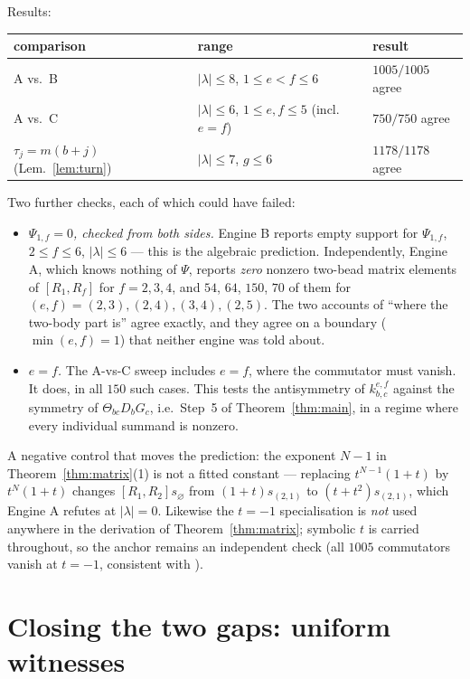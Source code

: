 \documentclass[11pt]{article}
\theoremstyle{definition}
\begin{document}
\noindent Results:
\begin{center}
\begin{tabular}{lll}
\hline
comparison & range & result\\
\hline
A vs.\ B & $|\lambda|\le8$, $1\le e<f\le6$ & $1005/1005$ agree\\
A vs.\ C & $|\lambda|\le6$, $1\le e,f\le5$ (incl.\ $e=f$) & $750/750$ agree\\
$\tau_j=m(b+j)$ (Lem.~\ref{lem:turn}) & $|\lambda|\le7$, $g\le6$ & $1178/1178$ agree\\
\hline
\end{tabular}
\end{center}

\noindent Two further checks, each of which could have failed:
\begin{itemize}
\item \emph{$\Psi_{1,f}=0$, checked from both sides.}  Engine B reports empty support for
$\Psi_{1,f}$, $2\le f\le6$, $|\lambda|\le6$ --- this is the algebraic prediction.
Independently, Engine A, which knows nothing of $\Psi$, reports \emph{zero} nonzero
two-bead matrix elements of $[R_1,R_f]$ for $f=2,3,4$, and $54$, $64$, $150$, $70$ of them
for $(e,f)=(2,3),(2,4),(3,4),(2,5)$.  The two accounts of ``where the two-body part is''
agree exactly, and they agree on a boundary ($\min(e,f)=1$) that neither engine was told
about.
\item \emph{$e=f$.}  The A-vs-C sweep includes $e=f$, where the commutator must vanish.
It does, in all $150$ such cases.  This tests the antisymmetry of $k^{e,f}_{b,c}$ against
the symmetry of $\Theta_{bc}D_bG_c$, i.e.\ Step~5 of Theorem~\ref{thm:main}, in a regime
where every individual summand is nonzero.
\end{itemize}

\noindent A negative control that moves the prediction: the exponent $N-1$ in
Theorem~\ref{thm:matrix}(1) is not a fitted constant --- replacing $t^{N-1}(1+t)$ by
$t^{N}(1+t)$ changes $[R_1,R_2]s_\varnothing$ from $(1+t)s_{(2,1)}$ to
$(t+t^{2})s_{(2,1)}$, which Engine A refutes at $|\lambda|=0$.  Likewise the $t=-1$
specialisation is \emph{not} used anywhere in the derivation of
Theorem~\ref{thm:matrix}; symbolic $t$ is carried throughout, so the anchor remains an
independent check (all $1005$ commutators vanish at $t=-1$, consistent with
\cite[Cor.~5.6]{Clio0906}).

\section{Closing the two gaps: uniform witnesses}\label{sec:closed}
\end{document}
